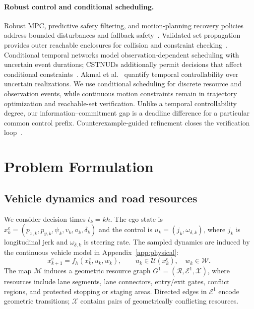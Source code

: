 \documentclass[letterpaper]{article} %
\begin{document}
\paragraph{Robust control and conditional scheduling.}
Robust MPC, predictive safety filtering, and motion-planning recovery policies address bounded disturbances and fallback safety~\citep{mayne2000constrained,wabersich2021predictive,kalaria2023delay,molnar2022safety,chen2022interactive,li2023marc,zheng2026occlusion}. Validated set propagation provides outer reachable enclosures for collision and constraint checking~\citep{althoff2021set}. Conditional temporal networks model observation-dependent scheduling with uncertain event durations; CSTNUDs additionally permit decisions that affect conditional constraints~\citep{hunsberger2018sound,zavatteri2019conditional}. Akmal et al.~\citep{akmal2020quantifying} quantify temporal controllability over uncertain realizations. We use conditional scheduling for discrete resource and observation events, while continuous motion constraints remain in trajectory optimization and reachable-set verification. Unlike a temporal controllability degree, our information--commitment gap is a deadline difference for a particular common control prefix. Counterexample-guided refinement closes the verification loop~\citep{alur2003counter,seipp2013counterexample}.

\section{Problem Formulation}
\label{sec:formulation}

\subsection{Vehicle dynamics and road resources}
We consider decision times $t_k=kh$. The ego state is $x_k^e=(p_{x,k},p_{y,k},\psi_k,v_k,a_k,\delta_k)$ and the control is $u_k=(j_k,\omega_{\delta,k})$, where $j_k$ is longitudinal jerk and $\omega_{\delta,k}$ is steering rate. The sampled dynamics are induced by the continuous vehicle model in Appendix~\ref{app:physical}:
\begin{equation}
 x_{k+1}^e=f_h(x_k^e,u_k,w_k),\qquad u_k\in\mathcal U(x_k^e),\quad w_k\in\mathcal W.
 \label{eq:disc-dyn}
\end{equation}
The map $\mathcal M$ induces a geometric resource graph $G^1=(\mathcal R,\mathcal E^1,\mathcal X)$, where resources include lane segments, lane connectors, entry/exit gates, conflict regions, and protected stopping or staging areas. Directed edges in $\mathcal E^1$ encode geometric transitions; $\mathcal X$ contains pairs of geometrically conflicting resources.
\end{document}
